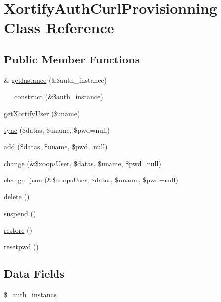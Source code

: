 \hypertarget{class_xortify_auth_curl_provisionning}{\section{Xortify\-Auth\-Curl\-Provisionning Class Reference}
\label{class_xortify_auth_curl_provisionning}
}
\subsection*{Public Member Functions}
\begin{DoxyCompactItemize}
\item 
\& \hyperlink{class_xortify_auth_curl_provisionning_a2c8eaa915c70d75289ac8a03686194f9}{get\-Instance} (\&\$auth\-\_\-instance)
\item 
\hyperlink{class_xortify_auth_curl_provisionning_a0f25832dc86774e7605b81fe57b083c2}{\-\_\-\-\_\-construct} (\&\$auth\-\_\-instance)
\item 
\hyperlink{class_xortify_auth_curl_provisionning_a041d726ac26672547ed1504e8e0117aa}{get\-Xortify\-User} (\$uname)
\item 
\hyperlink{class_xortify_auth_curl_provisionning_a35dc08b0f2138eb818ff95345b73bcff}{sync} (\$datas, \$uname, \$pwd=null)
\item 
\hyperlink{class_xortify_auth_curl_provisionning_adfc9fcef01e7bd7b2f47e8e79d51fc63}{add} (\$datas, \$uname, \$pwd=null)
\item 
\hyperlink{class_xortify_auth_curl_provisionning_ae1f0971b9712c794620cf309164e43af}{change} (\&\$xoops\-User, \$datas, \$uname, \$pwd=null)
\item 
\hyperlink{class_xortify_auth_curl_provisionning_a94f4e0408f26e65abca347ec883f4ec9}{change\-\_\-json} (\&\$xoops\-User, \$datas, \$uname, \$pwd=null)
\item 
\hyperlink{class_xortify_auth_curl_provisionning_a13bdffdd926f26b825ea57066334ff01}{delete} ()
\item 
\hyperlink{class_xortify_auth_curl_provisionning_ad73006a505121228f3b075c2409787d2}{suspend} ()
\item 
\hyperlink{class_xortify_auth_curl_provisionning_aa1371f22826cf8cde4454c9b467203d0}{restore} ()
\item 
\hyperlink{class_xortify_auth_curl_provisionning_a06d70fbd3a2db390b6f2530c0076628e}{resetpwd} ()
\end{DoxyCompactItemize}
\subsection*{Data Fields}
\begin{DoxyCompactItemize}
\item 
\hyperlink{class_xortify_auth_curl_provisionning_a486ed878bb5a7188c99ac4c9ee46ac6e}{\$\-\_\-auth\-\_\-instance}
\end{DoxyCompactItemize}


